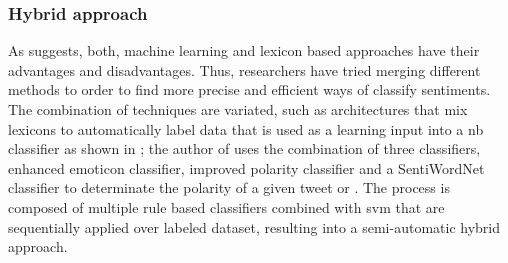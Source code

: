 \subsubsection{Hybrid approach}
\label{subsubsec:techniques_hybrid}

As \cite{thakkar2015approaches} suggests, both, machine learning and lexicon based approaches have their advantages and disadvantages. Thus, researchers have tried merging different methods to order to find more precise and efficient ways of classify sentiments. The combination of techniques are variated, such as architectures that mix lexicons to automatically label data that is used as a learning input into a \acrfull{nb} classifier as shown in \cite{pak2010twitter}; the author of \cite{khan2014tom} uses the combination of three classifiers, enhanced emoticon classifier, improved polarity classifier and a SentiWordNet classifier to determinate the polarity of a given tweet or \cite{prabowo2009sentiment}. The process is composed of multiple rule based classifiers combined with \acrshort{svm} that are sequentially applied over labeled dataset, resulting into a semi-automatic hybrid approach.